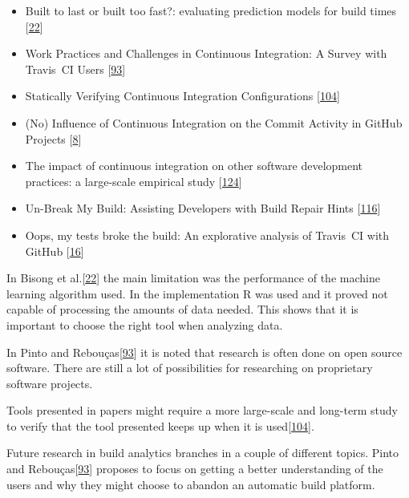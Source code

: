 \documentclass[]{book}
\providecommand{\tightlist}{%
  \setlength{\itemsep}{0pt}\setlength{\parskip}{0pt}}
\begin{document}
\begin{itemize}
\tightlist
\item
  Built to last or built too fast?: evaluating prediction models for
  build times {[}\protect\hyperlink{ref-bisong2017built}{22}{]}
\item
  Work Practices and Challenges in Continuous Integration: A Survey with
  Travis~CI Users {[}\protect\hyperlink{ref-pinto2018work}{93}{]}
\item
  Statically Verifying Continuous Integration Configurations
  {[}\protect\hyperlink{ref-santolucito2018statically}{104}{]}
\item
  (No) Influence of Continuous Integration on the Commit Activity in
  GitHub Projects {[}\protect\hyperlink{ref-baltes2018no}{8}{]}
\item
  The impact of continuous integration on other software development
  practices: a large-scale empirical study
  {[}\protect\hyperlink{ref-zhao2017impact}{124}{]}
\item
  Un-Break My Build: Assisting Developers with Build Repair Hints
  {[}\protect\hyperlink{ref-vassallo2018break}{116}{]}
\item
  Oops, my tests broke the build: An explorative analysis of Travis~CI
  with GitHub {[}\protect\hyperlink{ref-beller2017oops}{16}{]}
\end{itemize}

In Bisong et al.{[}\protect\hyperlink{ref-bisong2017built}{22}{]} the
main limitation was the performance of the machine learning algorithm
used. In the implementation R was used and it proved not capable of
processing the amounts of data needed. This shows that it is important
to choose the right tool when analyzing data.

In Pinto and Rebouças{[}\protect\hyperlink{ref-pinto2018work}{93}{]} it
is noted that research is often done on open source software. There are
still a lot of possibilities for researching on proprietary software
projects.

Tools presented in papers might require a more large-scale and long-term
study to verify that the tool presented keeps up when it is
used{[}\protect\hyperlink{ref-santolucito2018statically}{104}{]}.

Future research in build analytics branches in a couple of different
topics. Pinto and
Rebouças{[}\protect\hyperlink{ref-pinto2018work}{93}{]} proposes to
focus on getting a better understanding of the users and why they might
choose to abandon an automatic build platform.
\end{document}
